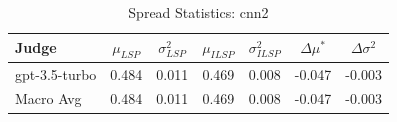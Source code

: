 \begin{table}[h]
\centering
\caption{Spread Statistics: cnn2}
\label{tab:spread_cnn2}
\begin{tabular}{l c c c c c c}
\hline
Judge & $\mu_{LSP}$ & $\sigma^2_{LSP}$ & $\mu_{ILSP}$ & $\sigma^2_{ILSP}$ & $\Delta\mu^*$ & $\Delta\sigma^2$ \\
\hline
gpt-3.5-turbo & 0.484 & 0.011 & 0.469 & 0.008 & -0.047 & -0.003 \\
\hline
Macro Avg & 0.484 & 0.011 & 0.469 & 0.008 & -0.047 & -0.003 \\
\hline
\end{tabular}
\end{table}